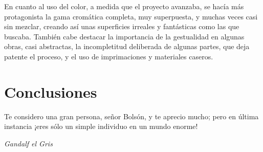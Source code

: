 \documentclass[twoside]{article}
\begin{document}
\begin{multicols}{2}
  En cuanto al uso del color, a medida que el proyecto avanzaba, se hacía
  más protagonista la gama cromática completa, muy superpuesta, y muchas
  veces casi sin mezclar, creando así unas superficies irreales y
  fantásticas como las que buscaba. También cabe destacar la importancia
  de la gestualidad en algunas obras, casi abstractas, la incompletitud
  deliberada de algunas partes, que deja patente el proceso, y el uso de
  imprimaciones y materiales caseros.
\end{multicols}
\newpage

\hypertarget{conclusiones}{
  \section{Conclusiones}\label{conclusiones}}
\epigraph{Te considero una gran persona, señor Bolsón, y te aprecio mucho; pero en última instancia ¡eres sólo un simple individuo en un mundo enorme!}{\textit{Gandalf el Gris}}
\end{document}
